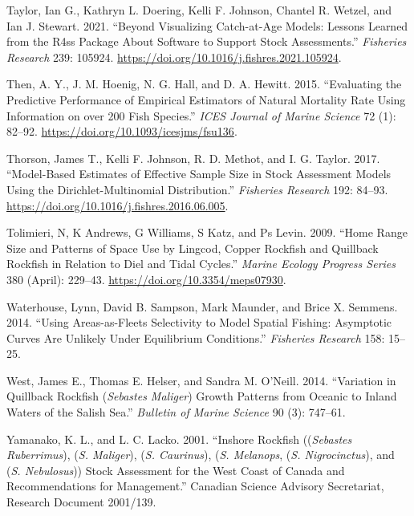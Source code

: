 \documentclass[11pt,
  english,
  a4paper,
]{article}
\begin{document}
\leavevmode\hypertarget{ref-r4ss_2021}{}%
Taylor, Ian G., Kathryn L. Doering, Kelli F. Johnson, Chantel R. Wetzel, and Ian J. Stewart. 2021. ``Beyond Visualizing Catch-at-Age Models: Lessons Learned from the R4ss Package About Software to Support Stock Assessments.'' \emph{Fisheries Research} 239: 105924. \url{https://doi.org/10.1016/j.fishres.2021.105924}.

\leavevmode\hypertarget{ref-then_evaluating_2015-1}{}%
Then, A. Y., J. M. Hoenig, N. G. Hall, and D. A. Hewitt. 2015. ``Evaluating the Predictive Performance of Empirical Estimators of Natural Mortality Rate Using Information on over 200 Fish Species.'' \emph{ICES Journal of Marine Science} 72 (1): 82--92. \url{https://doi.org/10.1093/icesjms/fsu136}.

\leavevmode\hypertarget{ref-thorson_model-based_2017}{}%
Thorson, James T., Kelli F. Johnson, R. D. Methot, and I. G. Taylor. 2017. ``Model-Based Estimates of Effective Sample Size in Stock Assessment Models Using the Dirichlet-Multinomial Distribution.'' \emph{Fisheries Research} 192: 84--93. \url{https://doi.org/10.1016/j.fishres.2016.06.005}.

\leavevmode\hypertarget{ref-tolimieri_home_2009}{}%
Tolimieri, N, K Andrews, G Williams, S Katz, and Ps Levin. 2009. ``Home Range Size and Patterns of Space Use by Lingcod, Copper Rockfish and Quillback Rockfish in Relation to Diel and Tidal Cycles.'' \emph{Marine Ecology Progress Series} 380 (April): 229--43. \url{https://doi.org/10.3354/meps07930}.

\leavevmode\hypertarget{ref-Waterhouseetal_spatialSelex_2014}{}%
Waterhouse, Lynn, David B. Sampson, Mark Maunder, and Brice X. Semmens. 2014. ``Using Areas-as-Fleets Selectivity to Model Spatial Fishing: Asymptotic Curves Are Unlikely Under Equilibrium Conditions.'' \emph{Fisheries Research} 158: 15--25.

\leavevmode\hypertarget{ref-Westetal_2014}{}%
West, James E., Thomas E. Helser, and Sandra M. O'Neill. 2014. ``Variation in Quillback Rockfish (\emph{Sebastes Maliger}) Growth Patterns from Oceanic to Inland Waters of the Salish Sea.'' \emph{Bulletin of Marine Science} 90 (3): 747--61.

\leavevmode\hypertarget{ref-YamanakaandLacko_rockfish_2001}{}%
Yamanako, K. L., and L. C. Lacko. 2001. ``Inshore Rockfish ((\emph{Sebastes Ruberrimus}), (\emph{S. Maliger}), (\emph{S. Caurinus}), (\emph{S. Melanops}, (\emph{S. Nigrocinctus}), and (\emph{S. Nebulosus})) Stock Assessment for the West Coast of Canada and Recommendations for Management.'' Canadian Science Advisory Secretariat, Research Document 2001/139.
\end{document}

